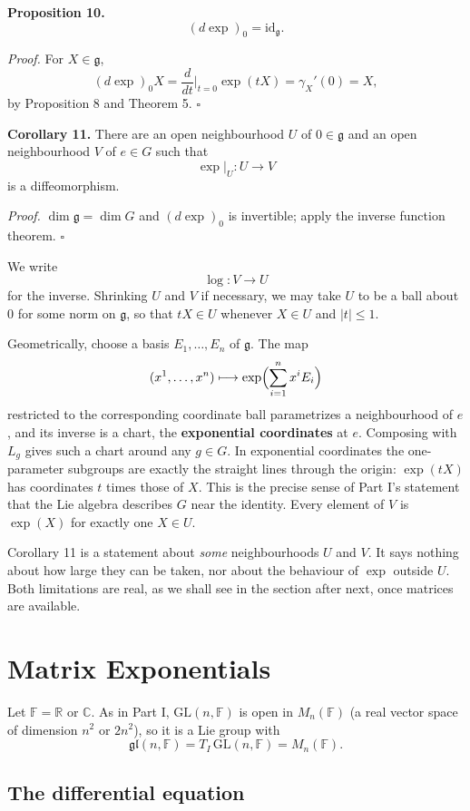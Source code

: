 \documentclass[11pt]{article}
\begin{document}
\textbf{Proposition 10.}
\[
\boxed{(d\exp)_0 = \mathrm{id}_{\mathfrak{g}}.}
\]

\emph{Proof.} For $X \in \mathfrak{g}$,
\[
(d\exp)_0 X = \frac{d}{dt}\Big|_{t=0} \exp(tX) = \gamma_X'(0) = X,
\]
by Proposition 8 and Theorem 5. $\square$

\textbf{Corollary 11.} There are an open neighbourhood $U$ of $0 \in \mathfrak{g}$ and an open neighbourhood $V$ of $e \in G$ such that
\[
\exp|_U : U \to V
\]
is a diffeomorphism.

\emph{Proof.} $\dim \mathfrak{g} = \dim G$ and $(d\exp)_0$ is invertible; apply the inverse function theorem. $\square$

We write
\[
\log : V \to U
\]
for the inverse. Shrinking $U$ and $V$ if necessary, we may take $U$ to be a ball about $0$ for some norm on $\mathfrak{g}$, so that $tX \in U$ whenever $X \in U$ and $|t| \le 1$.

Geometrically, choose a basis $E_1, \dots, E_n$ of $\mathfrak{g}$. The map
\[
(x^1, \dots, x^n) \longmapsto \exp\Bigl(\sum_{i=1}^n x^i E_i\Bigr)
\]
restricted to the corresponding coordinate ball parametrizes a neighbourhood of $e$, and its inverse is a chart, the \textbf{exponential coordinates} at $e$. Composing with $L_g$ gives such a chart around any $g \in G$. In exponential coordinates the one-parameter subgroups are exactly the straight lines through the origin: $\exp(tX)$ has coordinates $t$ times those of $X$. This is the precise sense of Part I's statement that the Lie algebra describes $G$ near the identity. Every element of $V$ is $\exp(X)$ for exactly one $X \in U$.

Corollary 11 is a statement about \emph{some} neighbourhoods $U$ and $V$. It says nothing about how large they can be taken, nor about the behaviour of $\exp$ outside $U$. Both limitations are real, as we shall see in the section after next, once matrices are available.

\section{Matrix Exponentials}

Let $\mathbb{F} = \mathbb{R}$ or $\mathbb{C}$. As in Part I, $\mathrm{GL}(n, \mathbb{F})$ is open in $M_n(\mathbb{F})$ (a real vector space of dimension $n^2$ or $2n^2$), so it is a Lie group with
\[
\mathfrak{gl}(n, \mathbb{F}) = T_I\,\mathrm{GL}(n, \mathbb{F}) = M_n(\mathbb{F}).
\]

\subsection{The differential equation}
\end{document}
